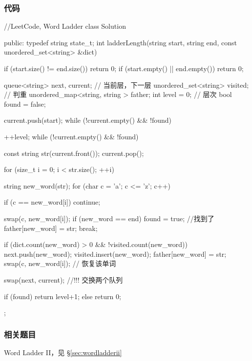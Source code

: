 \subsubsection{代码}
\begin{Code}
//LeetCode, Word Ladder
class Solution {
public:
    typedef string state_t;
    int ladderLength(string start, string end,
            const unordered_set<string> &dict) {
        if (start.size() != end.size()) return 0;
        if (start.empty() || end.empty()) return 0;

        queue<string> next, current; // 当前层，下一层
        unordered_set<string> visited; // 判重
        unordered_map<string, string > father;
        int level = 0;  // 层次
        bool found = false;

        current.push(start);
        while (!current.empty() && !found) {
            ++level;
            while (!current.empty() && !found) {
                const string str(current.front()); current.pop();

                for (size_t i = 0; i < str.size(); ++i) {
                    string new_word(str);
                    for (char c = 'a'; c <= 'z'; c++) {
                        if (c == new_word[i]) continue;

                        swap(c, new_word[i]);
                        if (new_word == end) {
                            found = true; //找到了
                            father[new_word] = str;
                            break;
                        }

                        if (dict.count(new_word) > 0
                                && !visited.count(new_word)) {
                            next.push(new_word);
                            visited.insert(new_word);
                            father[new_word] = str;
                        }
                        swap(c, new_word[i]); // 恢复该单词
                    }
                }
            }
            swap(next, current); //!!! 交换两个队列
        }
        if (found) return level+1;
        else return 0;
    }
};
\end{Code}


\subsubsection{相关题目}

\begindot
\item Word Ladder II，见 \S \ref{sec:wordladderii}
\myenddot


